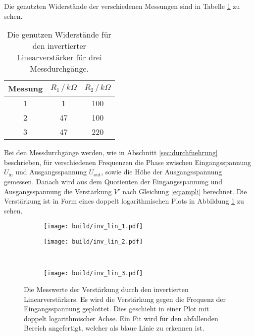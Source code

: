 Die genutzten Widerstände der verschiedenen Messungen sind in Tabelle \ref{tab:wider_inv_lin} zu sehen.
\begin{table}[H]
    \centering
    \begin{tabular}{ccc}
        \toprule
        Messung & $R_1 \, / \, k\Omega $ & $R_2 \, / \,  k\Omega $ \\
        \midrule 
        1 & 1 & 100 \\
        2 & 47 & 100 \\
        3 & 47 & 220 \\
        \bottomrule
    \end{tabular}
    \caption{Die genutzen Widerstände für den invertierter Linearverstärker für drei Messdurchgänge.}
    \label{tab:wider_inv_lin}
\end{table}
Bei den Messdurchgänge werden, wie in Abschnitt \ref{sec:durchfuehrung} beschrieben, für verschiedenen Frequenzen die Phase zwischen Eingangsspannung $U_\text{in}$ und Ausgangsspannung $U_\text{out}$, sowie die Höhe der Ausgangsspannung gemessen.
Danach wird aus dem Quotienten der Eingangsspannung und Ausgangsspannung die Verstärkung $V'$ nach Gleichung \ref{eq:ampli} berechnet.
Die Verstärkung ist in Form eines doppelt logarithmischen Plots in Abbildung \ref{fig:inv_lin} zu sehen.
\begin{figure}[H]
    \centering
    \begin{subfigure}{0.49\linewidth}%
        \texttt{[image: build/inv\_lin\_1.pdf]}
    \end{subfigure}
    \hfill
    \begin{subfigure}{0.49\linewidth}%
        \texttt{[image: build/inv\_lin\_2.pdf]}
    \end{subfigure}\\
    \begin{subfigure}{0.49\linewidth}%
        \texttt{[image: build/inv\_lin\_3.pdf]}
    \end{subfigure}
    \caption{Die Messwerte der Verstärkung durch den invertierten Linearverstärkers. Es wird die Verstärkung gegen die Frequenz der Eingangsspannung geplottet.
    Dies geschieht in einer Plot mit doppelt logarithmischer Achse. Ein Fit wird für den abfallenden Bereich angefertigt, welcher als blaue Linie zu erkennen ist.}
    \label{fig:inv_lin}
\end{figure}
